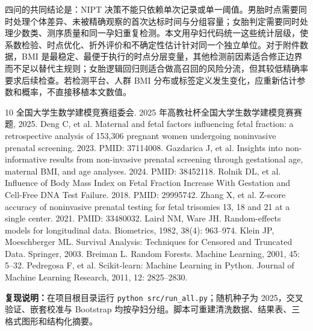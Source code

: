\documentclass[UTF8,a4paper,12pt]{ctexart}
\begin{document}
四问的共同结论是：NIPT 决策不能只依赖单次记录或单一阈值。男胎时点需要同时处理个体差异、未被精确观察的首次达标时间与分组容量；女胎判定需要同时处理少数类、测序质量和同一孕妇重复检测。本文用孕妇代码统一这些统计层级，使系数检验、时点优化、折外评价和不确定性估计针对同一个独立单位。对于附件数据，BMI 是最稳定、最便于执行的时点分层变量，其他检测前因素适合修正边界而不足以替代主规则；女胎逻辑回归则适合做高召回的风险分流，但其较低精确率要求后续检查。若检测平台、人群 BMI 分布或标签定义发生变化，应重新估计参数和概率，不直接移植本文数值。

{\small
\begin{thebibliography}{10}
\setlength{\itemsep}{0.2em}
 全国大学生数学建模竞赛组委会. 2025 年高教社杯全国大学生数学建模竞赛赛题, 2025.
 Deng C, et al. Maternal and fetal factors influencing fetal fraction: a retrospective analysis of 153,306 pregnant women undergoing noninvasive prenatal screening. 2023. PMID: 37114008.
 Gazdarica J, et al. Insights into non-informative results from non-invasive prenatal screening through gestational age, maternal BMI, and age analyses. 2024. PMID: 38452118.
 Rolnik DL, et al. Influence of Body Mass Index on Fetal Fraction Increase With Gestation and Cell-Free DNA Test Failure. 2018. PMID: 29995742.
 Zhang X, et al. Z-score accuracy of noninvasive prenatal testing for fetal trisomies 13, 18 and 21 at a single center. 2021. PMID: 33480032.
 Laird NM, Ware JH. Random-effects models for longitudinal data. Biometrics, 1982, 38(4): 963--974.
 Klein JP, Moeschberger ML. Survival Analysis: Techniques for Censored and Truncated Data. Springer, 2003.
 Breiman L. Random Forests. Machine Learning, 2001, 45: 5--32.
 Pedregosa F, et al. Scikit-learn: Machine Learning in Python. Journal of Machine Learning Research, 2011, 12: 2825--2830.
\end{thebibliography}
\par\smallskip
\appendix
{\footnotesize\noindent\textbf{复现说明：}在项目根目录运行 \texttt{python src/run\_all.py}；随机种子为 2025，交叉验证、嵌套校准与 Bootstrap 均按孕妇分组。脚本可重建清洗数据、结果表、三格式图形和结构化摘要。}
}
\end{document}
